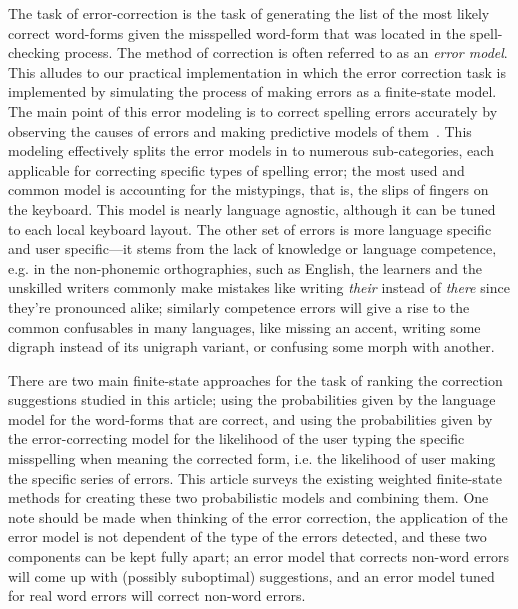 \documentclass[a4paper,12pt]{article}
\begin{document}
The task of error-correction is the task of generating the list of the most
likely correct word-forms given the misspelled word-form that was located in
the spell-checking process. The method of correction is often referred to as an
\emph{error model}. This alludes to our practical implementation in which the
error correction task is implemented by simulating the process of making errors
as a finite-state model. The main point of this error modeling is to correct
spelling errors accurately by observing the causes of errors and making
predictive models of them~\cite[]{deorowicz2005correcting}.  This modeling
effectively splits the error models in to numerous sub-categories, each
applicable for correcting specific types of spelling error; the most used and
common model is accounting for the mistypings, that is, the slips of fingers on
the keyboard. This model is nearly language agnostic, although it can be tuned
to each local keyboard layout. The other set of errors is more language
specific and user specific---it stems from the lack of knowledge or language
competence, e.g.  in the non-phonemic orthographies, such as English, the
learners and the unskilled writers commonly make mistakes like writing
\emph{their} instead of \emph{there} since they're pronounced alike; similarly
competence errors will give a rise to the common confusables in many languages,
like missing an accent, writing some digraph instead of its unigraph variant,
or confusing some morph with another.

There are two main finite-state approaches for the task of ranking the
correction suggestions studied in this article; using the probabilities given
by the language model for the word-forms that are correct, and using the
probabilities given by the error-correcting model for the likelihood of the
user typing the specific misspelling when meaning the corrected form, i.e. the
likelihood of user making the specific series of errors. This article surveys
the existing weighted finite-state methods for creating these two probabilistic
models and combining them. One note should be made when thinking of the error
correction, the application of the error model is not dependent of the type of
the errors detected, and these two components can be kept fully apart; an error
model that corrects non-word errors will come up with (possibly suboptimal)
suggestions, and an error model tuned for real word errors will correct
non-word errors.  
\end{document}
